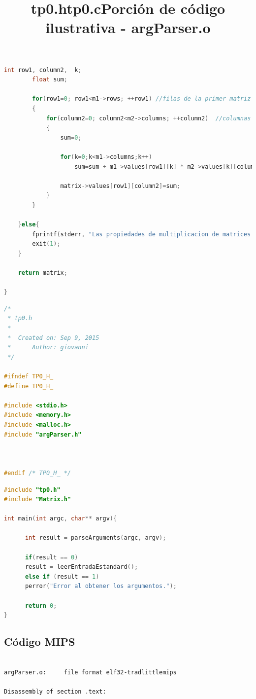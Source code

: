 \documentclass[a4paper,10pt]{article}
\begin{document}
{\begin{lstlisting}[language=C]
		int row1, column2,  k;
		float sum;

	    for(row1=0; row1<m1->rows; ++row1) //filas de la primer matriz
	    {
	    	for(column2=0; column2<m2->columns; ++column2)  //columnas de la segunda matriz
	    	{
	    		sum=0;

	    		for(k=0;k<m1->columns;k++)
	    			sum=sum + m1->values[row1][k] * m2->values[k][column2];

	    		matrix->values[row1][column2]=sum;
	    	}
	    }

	}else{
    	fprintf(stderr, "Las propiedades de multiplicacion de matrices no estan satisfechas.\n");
    	exit(1);
	}

	return matrix;

}

\end{lstlisting}


\title{tp0.h}
\begin{lstlisting}[language=C]
/*
 * tp0.h
 *
 *  Created on: Sep 9, 2015
 *      Author: giovanni
 */

#ifndef TP0_H_
#define TP0_H_

#include <stdio.h>
#include <memory.h>
#include <malloc.h>
#include "argParser.h"



#endif /* TP0_H_ */

\end{lstlisting}

\title{tp0.c}
\begin{lstlisting}[language=C]
#include "tp0.h"
#include "Matrix.h"

int main(int argc, char** argv){
	
      int result = parseArguments(argc, argv);
            
      if(result == 0)
	  result = leerEntradaEstandard();
      else if (result == 1)
	  perror("Error al obtener los argumentos.");
            
      return 0;
}
\end{lstlisting}

\subsection{C\'odigo MIPS}
\title{Porci\'on de c\'odigo ilustrativa - argParser.o}
\begin{lstlisting}

argParser.o:     file format elf32-tradlittlemips

Disassembly of section .text:


\end{lstlisting}}
\end{document}
